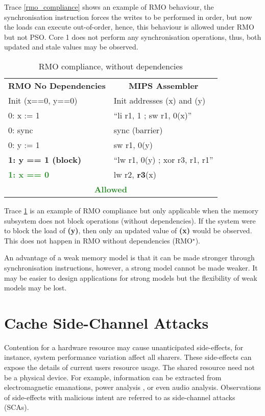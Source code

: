 			Trace \ref{rmo_compliance} shows an example of RMO behaviour, the synchronisation instruction forces the writes to be performed in order, but now the loads can execute out-of-order, hence, this behaviour is allowed under RMO but not PSO. Core 1 does not perform any synchronisation operations, thus, both updated and stale values may be observed.
			
			\captionsetup[table]{name=Trace}
			\begin{table}[!h]
			\begin{center}
			\selectfont
			\begin{tabular}{|l|l|}
				\hline
				\multicolumn{1}{|c|}{\textbf{RMO No Dependencies}} & \multicolumn{1}{c|}{\textbf{MIPS Assembler}} \\
				Init (x==0, y==0) & Init addresses (x) and (y) \\
				\hline
				0: x := 1 & ``li r1, 1 ; sw r1, 0(x)'' \\
				0: sync & sync (barrier) \\
				0: y := 1 & sw r1, 0(y) \\
				\textbf{\textcolor{BurntOrange}{1: y == 1 (block)}} & ``lw r1, 0(y) ; xor r3, r1, r1'' \\
				\textbf{\textcolor{ForestGreen}{1: x == 0}} & lw r2, \textbf{\textcolor{BurntOrange}{r3}}(x) \\
				\hline
				\multicolumn{2}{|c|}{\textbf{\textcolor{ForestGreen}{Allowed}}} \\
				\hline
			\end{tabular}
			\caption{RMO compliance, without dependencies}
			\label{rmo_no_dep_compliance}
			\end{center} 
			\end{table}
			\captionsetup[table]{name=Table}
			
			Trace \ref{rmo_no_dep_compliance} is an example of RMO compliance but only applicable when the memory subsystem does not block operations (without dependencies). If the system were to block the load of \textbf{(y)}, then only an updated value of \textbf{(x)} would be observed. This does not happen in RMO without dependencies (RMO{\large$^\star$}). 
			
			An advantage of a weak memory model is that it can be made stronger through synchronisation instructions, however, a strong model cannot be made weaker. It may be easier to design applications for strong models but the flexibility of weak models may be lost.

\section{Cache Side-Channel Attacks}
	Contention for a hardware resource may cause unanticipated side-effects, for instance, system performance variation affect all sharers. These side-effects can expose the details of current users resource usage. The shared resource need not be a physical device. For example, information can be extracted from electromagnetic emanations, power analysis \cite{Mangard07}, or even audio analysis. Observations of side-effects with malicious intent are referred to as side-channel attacks (SCAs).
	
